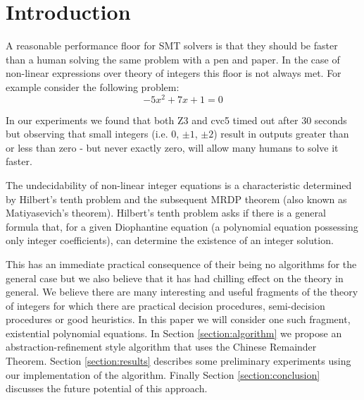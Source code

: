 \section{Introduction}


A reasonable performance floor for SMT solvers is that they should be
faster than a human solving the same problem with a pen and paper.
%
In the case of non-linear expressions over theory of integers this
floor is not always met.
%
For example consider the following problem: 
\[-5x^2 + 7x + 1 = 0\]

In our experiments we found that both Z3 and cvc5 timed out after 30 
seconds but observing that small integers (i.e. $0$, $\pm 1$, $\pm 2$)
result in outputs greater than or less than zero - but never exactly
zero, will allow many humans to solve it faster.

The undecidability of non-linear integer equations is a characteristic
determined by Hilbert's tenth problem and the subsequent MRDP theorem 
(also known as Matiyasevich's theorem). Hilbert's tenth problem asks 
if there is a general formula that, for a given Diophantine equation 
(a polynomial equation possessing only integer coefficients), can 
determine the existence of an integer solution.

This has an immediate practical consequence of their being no
algorithms for the general case but we also believe that it has had
chilling effect on the theory in general.
%
We believe there are many interesting and useful fragments of the
theory of integers for which there are practical decision procedures,
semi-decision procedures or good heuristics.
In this paper we will consider one such fragment, existential
polynomial equations.
%
In Section \ref{section:algorithm} we propose an
abstraction-refinement style algorithm that uses the Chinese Remainder
Theorem.
Section \ref{section:results} describes some preliminary experiments
using our implementation of the algorithm.
Finally Section \ref{section:conclusion} discusses the future
potential of this approach.
